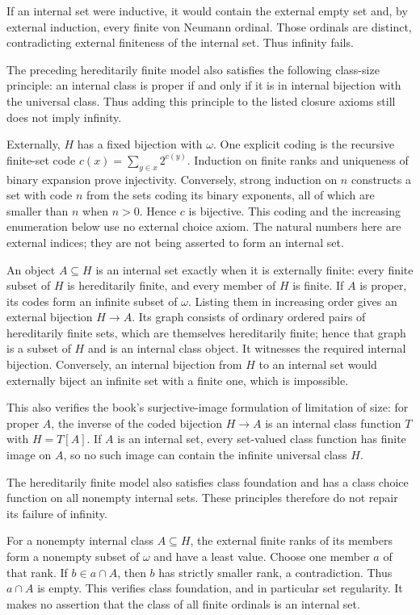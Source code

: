If an internal set were inductive, it would contain the external empty
set and, by external induction, every finite von Neumann ordinal.
Those ordinals are distinct, contradicting external finiteness of the
internal set. Thus infinity fails.
\Done

\begin{corollary}
The preceding hereditarily finite model also satisfies the following
class-size principle: an internal class is proper if and only if it is
in internal bijection with the universal class. Thus adding this
principle to the listed closure axioms still does not imply infinity.
\end{corollary}
\Proof
Externally, $H$ has a fixed bijection with $\omega$. One explicit coding
is the recursive finite-set code
$c(x)=\sum_{y\in x}2^{c(y)}$. Induction on finite ranks and uniqueness
of binary expansion prove injectivity. Conversely, strong induction on
$n$ constructs a set with code $n$ from the sets coding its binary
exponents, all of which are smaller than $n$ when $n>0$. Hence $c$ is
bijective. This coding and the increasing enumeration below use no
external choice axiom. The natural numbers here are external indices;
they are not being asserted to form an internal set.

An object $A\subseteq H$ is an internal set exactly when it is
externally finite: every finite subset of $H$ is hereditarily finite,
and every member of $H$ is finite. If $A$ is proper, its codes form an
infinite subset of $\omega$. Listing them in increasing order gives an
external bijection $H\to A$. Its graph consists of ordinary ordered
pairs of hereditarily finite sets, which are themselves hereditarily
finite; hence that graph is a subset of $H$ and is an internal class
object. It witnesses the required internal bijection. Conversely, an
internal bijection from $H$ to an internal set would externally biject
an infinite set with a finite one, which is impossible.

This also verifies the book's surjective-image formulation of limitation
of size: for proper $A$, the inverse of the coded bijection $H\to A$
is an internal class function $T$ with $H=T[A]$. If $A$ is an
internal set, every set-valued class function has finite image on $A$,
so no such image can contain the infinite universal class $H$.
\Done

\begin{corollary}
The hereditarily finite model also satisfies class foundation and has a
class choice function on all nonempty internal sets. These principles
therefore do not repair its failure of infinity.
\end{corollary}
\Proof
For a nonempty internal class $A\subseteq H$, the external finite ranks
of its members form a nonempty subset of $\omega$ and have a least
value. Choose one member $a$ of that rank. If $b\in a\cap A$, then
$b$ has strictly smaller rank, a contradiction. Thus $a\cap A$ is
empty. This verifies class foundation, and in particular set regularity.
It makes no assertion that the class of all finite ordinals is an
internal set.

